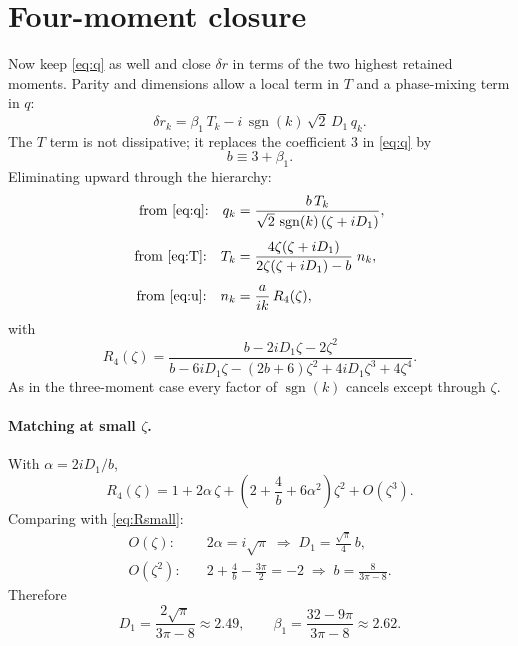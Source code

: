 \documentclass[11pt]{article}
\newcommand{\sgn}{\operatorname{sgn}}
\begin{document}
\section{Four-moment closure}

Now keep \eqref{eq:q} as well and close $\delta r$ in terms of the two
highest retained moments. Parity and dimensions allow a local term in $T$ and
a phase-mixing term in $q$:
\begin{equation}
  \delta r_k = \beta_1\,T_k - i\,\sgn(k)\,\sqrt{2}\,D_1\,q_k .
  \label{eq:closure4}
\end{equation}
The $T$ term is not dissipative; it replaces the coefficient $3$ in
\eqref{eq:q} by
\[
  b \equiv 3 + \beta_1 .
\]
Eliminating upward through the hierarchy:
\begin{align*}
  \text{from \eqref{eq:q}:}\quad
    q_k &= \frac{b\,T_k}{\sqrt{2}\,\sgn(k)\,(\zeta + iD_1)},\\[4pt]
  \text{from \eqref{eq:T}:}\quad
    T_k &= \frac{4\zeta(\zeta + iD_1)}{2\zeta(\zeta + iD_1) - b}\;n_k,\\[4pt]
  \text{from \eqref{eq:u}:}\quad
    n_k &= \frac{a}{ik}\,R_4(\zeta),
\end{align*}
with
\begin{equation}
  R_4(\zeta) = \frac{b - 2iD_1\zeta - 2\zeta^2}
                    {b - 6iD_1\zeta - (2b+6)\zeta^2
                     + 4iD_1\zeta^3 + 4\zeta^4}.
  \label{eq:R4}
\end{equation}
As in the three-moment case every factor of $\sgn(k)$ cancels except through
$\zeta$.

\paragraph{Matching at small $\zeta$.} With $\alpha = 2iD_1/b$,
\[
  R_4(\zeta) = 1 + 2\alpha\,\zeta
             + \left(2 + \frac{4}{b} + 6\alpha^2\right)\zeta^2 + O(\zeta^3).
\]
Comparing with \eqref{eq:Rsmall}:
\begin{align*}
  O(\zeta):&\quad 2\alpha = i\sqrt{\pi}
    \;\Longrightarrow\; D_1 = \frac{\sqrt{\pi}}{4}\,b,\\
  O(\zeta^2):&\quad 2 + \frac{4}{b} - \frac{3\pi}{2} = -2
    \;\Longrightarrow\; b = \frac{8}{3\pi - 8}.
\end{align*}
Therefore
\begin{equation}
  D_1 = \frac{2\sqrt{\pi}}{3\pi - 8} \approx 2.49,
  \qquad
  \beta_1 = \frac{32 - 9\pi}{3\pi - 8} \approx 2.62 .
  \label{eq:coeffs4}
\end{equation}
\end{document}
